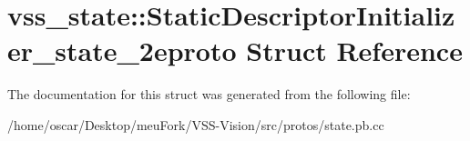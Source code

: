 \hypertarget{structvss__state_1_1StaticDescriptorInitializer__state__2eproto}{\section{vss\-\_\-state\-:\-:Static\-Descriptor\-Initializer\-\_\-state\-\_\-2eproto Struct Reference}
\label{structvss__state_1_1StaticDescriptorInitializer__state__2eproto}
}


The documentation for this struct was generated from the following file\-:\begin{DoxyCompactItemize}
\item 
/home/oscar/\-Desktop/meu\-Fork/\-V\-S\-S-\/\-Vision/src/protos/state.\-pb.\-cc\end{DoxyCompactItemize}
